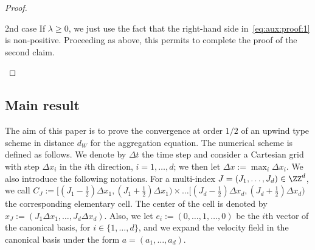 \begin{proof}
\begin{laststep}{2nd case}
If $\lambda \geq 0$, we just use the fact that the right-hand side in~\eqref{eq:aux:proof:1} is non-positive. Proceeding as above, this permits to complete the proof of the second claim.
\end{laststep}
\let\qed\relax
\end{proof}


\subsection{Main result}

The aim of this paper is to prove the convergence at order $1/2$ of an upwind type scheme in distance $d_W$ for the aggregation equation. The numerical scheme is defined as follows. We denote by $\Delta t$ the time step and consider a Cartesian grid with step $\Delta x_i$ in the $i$th direction, $i=1,\ldots,d$; we then let $\Delta x:=\max_i \Delta x_i$. We also introduce the following notations. For a multi-index $J=(J_1, \ldots, J_d)\in \ZZ^d$, we call $C_J:=[(J_1-\frac{1}{2})\Delta x_1,(J_1+\frac{1}{2})\Delta x_1)\times \ldots [(J_d-\frac{1}{2})\Delta x_d,(J_d+\frac{1}{2})\Delta x_d)$ the corresponding elementary cell. The center of the cell is denoted by $x_J := (J_1\Delta x_1, \ldots, J_d \Delta x_d).$ Also, we let $e_i := (0,\ldots,1,\ldots,0)$ be the $i$th vector of the canonical basis, for $i \in \{1,\ldots,d\}$, and we expand the velocity field in the canonical basis under the form $a=(a_1,\ldots,a_d)$.

